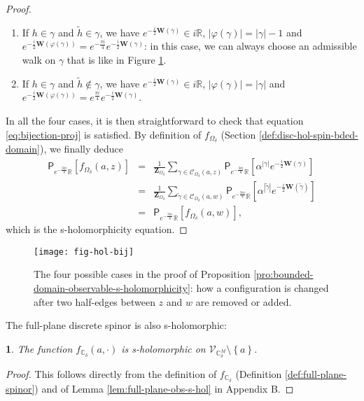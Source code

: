 \documentclass[oneside,english]{amsart}
\numberwithin{equation}{section}
\numberwithin{figure}{section}
\theoremstyle{plain}
\theoremstyle{plain}
\theoremstyle{plain}
\theoremstyle{plain}
\newtheorem{prop}[thm]{\protect\propositionname}
\theoremstyle{plain}
\theoremstyle{definition}
\theoremstyle{remark}
\providecommand{\propositionname}{Proposition}
\begin{document}
\begin{proof}
\begin{enumerate}
\item If $h\in\gamma$ and $\tilde{h}\in\gamma$, we have $e^{-\frac{i}{2}\mathbf{W}\left(\gamma\right)}\in i\mathbb{R}$,
$\left|\varphi\left(\gamma\right)\right|=\left|\gamma\right|-1$ and
$e^{-\frac{i}{2}\mathbf{W}\left(\varphi\left(\gamma\right)\right)}=e^{-\frac{\pi i}{4}}e^{-\frac{i}{2}\mathbf{W}\left(\gamma\right)}$:
in this case, we can always choose an admissible walk on $\gamma$
that is like in Figure \ref{fig:bijections}.
\item If $h\in\gamma$ and $\tilde{h}\notin\gamma$, we have $e^{-\frac{i}{2}\mathbf{W}\left(\gamma\right)}\in i\mathbb{R}$,
$\left|\varphi\left(\gamma\right)\right|=\left|\gamma\right|$ and
$e^{-\frac{i}{2}\mathbf{W}\left(\varphi\left(\gamma\right)\right)}=e^{\frac{\pi i}{4}}e^{-\frac{i}{2}\mathbf{W}\left(\gamma\right)}$.
\end{enumerate}
In all the four cases, it is then straightforward to check that equation
\ref{eq:bijection-proj} is satisfied. By definition of $f_{\Omega_{\delta}}$
(Section \ref{def:disc-hol-spin-bded-domain}), we finally deduce
\begin{eqnarray*}
\mathsf{P}_{e^{-\frac{3\pi i}{8}}\mathbb{R}}\left[f_{\Omega_{\delta}}\left(a,z\right)\right] & = & \frac{1}{\mathbf{Z}_{\Omega_{\delta}}}\sum_{\gamma\in\mathcal{C}_{\Omega_{\delta}}\left(a,z\right)}\mathsf{P}_{e^{-\frac{3\pi i}{8}}\mathbb{R}}\left[\alpha^{\left|\gamma\right|}e^{-\frac{i}{2}\mathbf{W}\left(\gamma\right)}\right]\\
 & = & \frac{1}{\mathbf{Z}_{\Omega_{\delta}}}\sum_{\tilde{\gamma}\in\mathcal{C}_{\Omega_{\delta}}\left(a,w\right)}\mathsf{P}_{e^{-\frac{3\pi i}{8}}\mathbb{R}}\left[\alpha^{\left|\tilde{\gamma}\right|}e^{-\frac{i}{2}\mathbf{W}\left(\tilde{\gamma}\right)}\right]\\
 & = & \mathsf{P}_{e^{-\frac{3\pi i}{8}}\mathbb{R}}\left[f_{\Omega_{\delta}}\left(a,w\right)\right],
\end{eqnarray*}
which is the s-holomorphicity equation.
\end{proof}
\begin{figure}
\texttt{[image: fig-hol-bij]}\caption{\label{fig:bijections}The four possible cases in the proof of Proposition
\ref{pro:bounded-domain-observable-s-holomorphicity}: how a configuration
is changed after two half-edges between $z$ and $w$ are removed
or added.}
\end{figure}


The full-plane discrete spinor is also s-holomorphic:
\begin{prop}
\label{pro:full-plane-observable-s-holomorphicity}The function $f_{\mathbb{C}_{\delta}}\left(a,\cdot\right)$
is s-holomorphic on $\mathcal{V}_{\mathbb{C}_{\delta}^{M}}\setminus\left\{ a\right\} $.\end{prop}
\begin{proof}
This follows directly from the definition of $f_{\mathbb{C}_{\delta}}$
(Definition \ref{def:full-plane-spinor}) and of Lemma \ref{lem:full-plane-obs-s-hol}
in Appendix B.
\end{proof}
\end{document}
